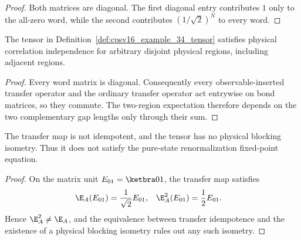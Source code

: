 \begin{proof}
    \leanok
    Both matrices are diagonal. The first diagonal entry contributes $1$ only
    to the all-zero word, while the second contributes
    $(1/\sqrt2)^N$ to every word.
\end{proof}

\begin{lemma}
    \label{thm:cpsv16_example_34_cid}
    \leanok
    The tensor in Definition~\ref{def:cpsv16_example_34_tensor} satisfies
    physical correlation independence for arbitrary disjoint physical regions,
    including adjacent regions.
\end{lemma}

\begin{proof}
    \leanok
    Every word matrix is diagonal. Consequently every observable-inserted
    transfer operator and the ordinary transfer operator act entrywise on bond
    matrices, so they commute. The two-region expectation therefore depends on
    the two complementary gap lengths only through their sum.
\end{proof}

\begin{lemma}
    \label{thm:cpsv16_example_34_not_rfp}
    \leanok
    The transfer map is not idempotent, and the tensor has no physical blocking
    isometry. Thus it does not satisfy the pure-state renormalization
    fixed-point equation.
\end{lemma}

\begin{proof}
    \leanok
    On the matrix unit $E_{01}=\ketbra0{1}$, the transfer map satisfies
    \begin{align}
        \E_A(E_{01})   & =\frac{1}{\sqrt2}E_{01},
                       &
        \E_A^2(E_{01}) & =\frac12E_{01}.
        \notag
    \end{align}
    Hence $\E_A^2\ne\E_A$, and the equivalence between transfer idempotence
    and the existence of a physical blocking isometry rules out any such
    isometry.
\end{proof}


